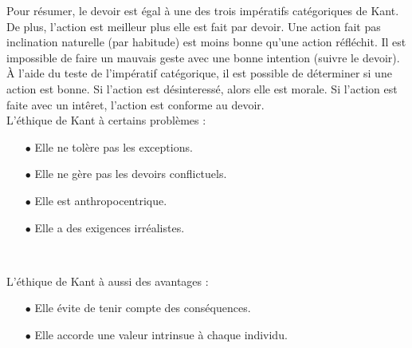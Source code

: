 \documentclass[11pt]{article}
\begin{document}
Pour résumer, le devoir est égal à une des trois impératifs catégoriques de Kant. De plus, l'action est meilleur plus elle est fait par devoir. Une action fait pas inclination naturelle (par habitude) est moins bonne qu'une action réfléchit. Il est impossible de faire un mauvais geste avec une bonne intention (suivre le devoir).\\

À l'aide du teste de l'impératif catégorique, il est possible de déterminer si une action est bonne. Si l'action est désinteressé, alors elle est morale. Si l'action est faite avec un intêret, l'action est conforme au devoir.\\

L'éthique de Kant à certains problèmes :
\begin{itemize}
\item[$\bullet$] Elle ne tolère pas les exceptions.
\item[         ] 
\item[$\bullet$] Elle ne gère pas les devoirs conflictuels.
\item[         ] 
\item[$\bullet$] Elle est anthropocentrique.
\item[         ] 
\item[$\bullet$] Elle a des exigences irréalistes.
\item[         ] \\
\end{itemize}

L'éthique de Kant à aussi des avantages :
\begin{itemize}
\item[$\bullet$] Elle évite de tenir compte des conséquences.
\item[$\bullet$] Elle accorde une valeur intrinsue à chaque individu.
\end{itemize}
\end{document}
